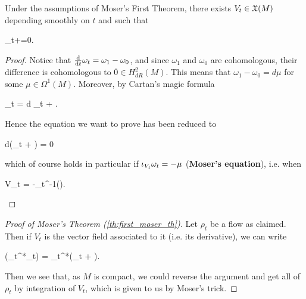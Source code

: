 \documentclass[main.tex]{subfiles}
\begin{document}
\begin{lemma}
	Under the assumptions of Moser's First Theorem, there exists $V_t \in \mathfrak{X}(M)$ depending smoothly on $t$ and such that
	\begin{eqalign}
		\omega_t+=0.
	\end{eqalign}
\end{lemma}
\begin{proof}
	Notice that $\frac{\mathrm{d}{}}{\mathrm{d}{t}} \omega_t = \omega_1-\omega_0$, and since $\omega_1$ and $\omega_0$ are cohomologous, their difference is cohomologous to $\overline 0 \in H^2_{dR}(M)$. This means that $\omega_1 -\omega_0 = d\mu$ for some $\mu \in \Omega^1(M)$. Moreover, by Cartan's magic formula
	\begin{eqalign}
		\omega_t = d \omega_t + \cancel{\ipr{V_t}d\omega_t}.
	\end{eqalign}
	Hence the equation we want to prove has been reduced to
	\begin{eqalign}
		d(\omega_t + \mu) = 0
	\end{eqalign}
	which of course holds in particular if $\iota_{V_t}\omega_t = -\mu$ (\textbf{Moser's equation}), i.e. when
	\begin{eqalign}
		V_t = -\omega_t^{-1}(\mu).
	\end{eqalign}
\end{proof}

\begin{proof}[Proof of Moser's Theorem (\ref{th:first_moser_th})]
	Let $\rho_t$ be a flow as claimed. Then if $V_t$ is the vector field associated to it (i.e. its derivative\footnotemark), we can write
	\begin{eqalign}
	\label{eq:der_of_flowing_symp}
		(\rho_t^*\omega_t) = \rho_t^*\left(\omega_t + \right).
	\end{eqalign}
	Then we see that, as $M$ is compact, we could reverse the argument and get all of $\rho_t$ by integration of $V_t$, which is given to us by Moser's trick.
\end{proof}
\end{document}
